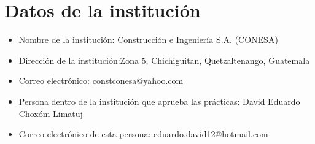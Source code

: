 \documentclass[12pt]{article}
\begin{document}
	\section*{Datos de la institución}
	\begin{itemize}[label=$\blacksquare$]
		\item Nombre de la institución: Construcción e Ingeniería S.A. (CONESA)
		\item Dirección de la institución:Zona 5, Chichiguitan, Quetzaltenango, Guatemala
		\item Correo electrónico: constconesa@yahoo.com
		\item Persona dentro de la institución que aprueba las prácticas: David Eduardo Choxóm Limatuj
		\item Correo electrónico de esta persona: eduardo.david12@hotmail.com
	\end{itemize}
	
\end{document}
